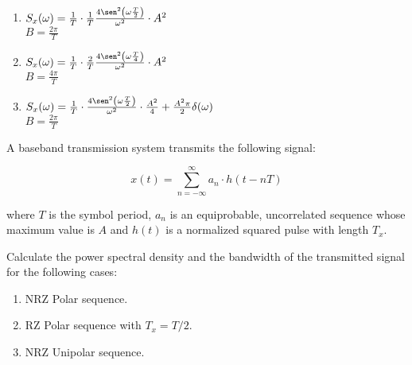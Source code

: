 \documentclass[es,boletin]{uah}
\begin{document}
{
\begin{enumerate}
	\item $S_x(\omega) = \frac{1}{T} \cdot \frac{1}{T} \frac{4 \sen^2\left ( \omega \frac{T}{2}\right )}{\omega^2} \cdot A^2$ \\
			$B = \frac{2\pi}{T}$
	\item $S_x(\omega) = \frac{1}{T} \cdot \frac{2}{T} \frac{4 \sen^2\left ( \omega \frac{T}{4}\right )}{\omega^2} \cdot A^2$ \\
			$B = \frac{4\pi}{T}$
	\item $S_x(\omega) = \frac{1}{T} \cdot \frac{4 \sen^2\left ( \omega \frac{T}{2}\right )}{\omega^2} \cdot \frac{A^2}{4} + \frac{A^2 \pi}{2} \delta(\omega)$ \\
			$B = \frac{2\pi}{T}$
\end{enumerate}
}
{
	A baseband transmission system transmits the following signal:

	\begin{displaymath}
		x(t) = \sum_{n=-\infty}^{\infty} a_n \cdot h(t-nT)
	\end{displaymath}
	
	where $T$ is the symbol period, $a_n$ is an equiprobable, uncorrelated sequence whose maximum value is $A$ and $h(t)$ is a normalized squared pulse with length $T_x$. 
	
	Calculate the power spectral density and the bandwidth of the transmitted signal for the following cases:
	
	\begin{enumerate}
		\item NRZ Polar sequence.
		 \item RZ Polar sequence with $T_x=T/2$.
		 \item NRZ Unipolar sequence.
	\end{enumerate}
	
}
\end{document}
